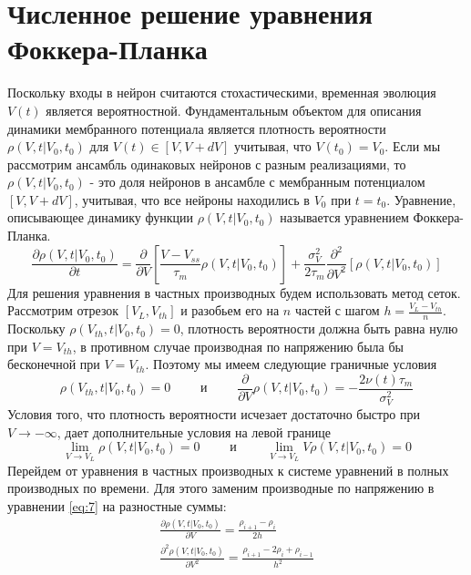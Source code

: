 \section{Численное решение уравнения Фоккера-Планка}
Поскольку входы в нейрон считаются стохастическими, временная эволюция
$V(t)$ является вероятностной. Фундаментальным объектом для описания динамики мембранного потенциала является плотность вероятности $\rho(V, t|V_0, t_0)$ для $V(t)\in[V, V+dV]$ учитывая, что $V(t_0)=V_0$. Если мы рассмотрим ансамбль одинаковых нейронов с разным реализациями, то $\rho(V, t|V_0, t_0)$ - это доля нейронов в ансамбле с мембранным потенциалом $[V, V+dV]$, учитывая, что все нейроны находились в $V_0$ при $t=t_0$. Уравнение, описывающее динамику функции $\rho(V, t|V_0, t_0)$ называется уравнением Фоккера-Планка.
\begin{equation}
\frac{\partial \rho(V, t|V_0, t_0)}{\partial t}=
\frac{\partial }{\partial V}\left[\frac{V-V_{ss}}{\tau_m}\rho(V, t|V_0, t_0)\right]+\frac{\sigma_V^2}{2\tau_m}\frac{\partial^2 }{\partial V^2}\left[\rho(V, t|V_0, t_0)\right]
\label{eq:7}
\end{equation}
Для решения уравнения в частных производных будем использовать метод сеток. Рассмотрим отрезок $[V_L, V_{th}]$ и разобьем его на $n$ частей с шагом $\displaystyle h=\frac{V_L- V_{th}}{n}$. Поскольку $\rho(V_{th}, t|V_0, t_0)=0$, плотность вероятности должна быть равна нулю при $V=V_{th}$, в противном случае производная по напряжению была бы бесконечной при $V=V_{th}$. Поэтому мы имеем следующие граничные условия 
\begin{equation}
	\rho(V_{th}, t|V_0, t_0)=0 \qquad \text{ и } \qquad \frac{\partial }{\partial V}\rho(V, t|V_0, t_0)=-\frac{2\nu(t)\tau_m}{\sigma_V^2}
	\label{eq:8}
\end{equation}
Условия того, что плотность вероятности исчезает
достаточно быстро при $V\to-\infty$, дает дополнительные условия на левой границе
\begin{equation}
	\lim\limits_{V\to V_L}\rho(V, t|V_0, t_0)=0 \qquad \text{ и } \qquad \lim\limits_{V\to V_L}V\rho(V, t|V_0, t_0)=0
	\label{eq:9}
\end{equation}
Перейдем от уравнения в частных производных к системе уравнений в полных производных по времени. Для этого заменим производные по напряжению в уравнении \eqref{eq:7} на разностные суммы:
\begin{equation}
\begin{split}
	\frac{\partial \rho(V, t|V_0, t_0)}{\partial V}=\frac{\rho_{i+1}-\rho_{i}}{2h} \\
	\frac{\partial^2 \rho(V, t|V_0, t_0)}{\partial V^2}=\frac{\rho_{i+1}-2\rho_{i}+\rho_{i-1}}{h^2}
	\label{eq:10}
\end{split}
\end{equation}
